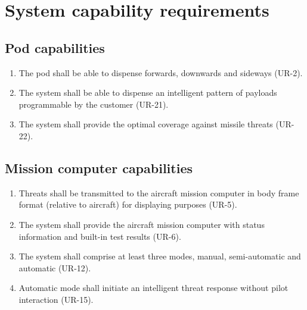 \documentclass[Main]{subfiles}
\begin{document}
\section{System capability requirements}

\subsection{Pod capabilities}\label{pod}

\begin{enumerate}[{UR}-1]
\item The pod shall be able to dispense forwards, downwards and sideways (UR-2).

\item The system shall be able to dispense an intelligent pattern of payloads programmable by the customer (UR-21).

\item The system shall provide the optimal coverage against missile threats (UR-22).

\end{enumerate}

\subsection{Mission computer capabilities}

\begin{enumerate}
\item Threats shall be transmitted to the aircraft mission computer in body frame format (relative to aircraft) for displaying purposes (UR-5).

\item The system shall provide the aircraft mission computer with status information and built-in test results (UR-6).

\item The system shall comprise at least three modes, manual, semi-automatic and automatic (UR-12).

\item Automatic mode shall initiate an intelligent threat response without pilot interaction (UR-15).

\end{enumerate}
\end{document}

